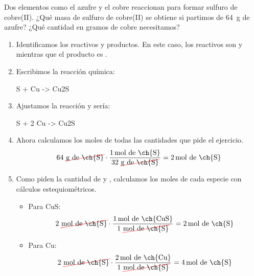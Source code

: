 \begin{example}

    Dos elementos como el azufre y el cobre reaccionan para formar sulfuro de cobre(II). ¿Qué masa de sulfuro de cobre(II) se obtiene si partimos de \qty{64}{\g} de azufre?
    ¿Qué cantidad en gramos de cobre necesitamos?

    \begin{enumerate}[label=\numberballmDarkTeal]
            \item Identificamos los reactivos y productos.
            En este caso, los reactivos son  y  mientras que el producto es .
            \item Escribimos la reacción química:
            \begin{reaction*}
                S + Cu -> Cu2S
            \end{reaction*}
            \item Ajustamos la reacción y sería:
            \begin{reaction*}
                S + 2 Cu -> Cu2S
            \end{reaction*}
            \item Ahora calculamos los moles de todas las cantidades que pide el ejercicio.
            \begin{equation*}
                64\ \cancelred{\unit{\g}\ \text{de \ch{S}}} \cdot \dfrac{\qty{1}{\mole}\ \text{de \ch{S}}}{32\ \cancelred{\unit{\g} \ \text{de \ch{S}}}} = \qty{2}{\mol}\ \text{de \ch{S}}
            \end{equation*}
            \item Como piden la cantidad de  y , calculamos los moles de cada especie con cálculos estequiométricos.
            \begin{itemize}
                \item Para CuS:
                \begin{equation*}
                    2\ \cancelred{\unit{\mol}\ \text{de \ch{S}}} \cdot \dfrac{\qty{1}{\mole}\ \text{de \ch{CuS}}}{1\ \cancelred{\unit{\mole} \ \text{de \ch{S}}}} = \qty{2}{\mol}\ \text{de \ch{S}}
                \end{equation*}
                \item Para Cu:
                \begin{equation*}
                    2\ \cancelred{\unit{\mol}\ \text{de \ch{S}}} \cdot \dfrac{\qty{2}{\mole}\ \text{de \ch{Cu}}}{1\ \cancelred{\unit{\mole} \ \text{de \ch{S}}}} = \qty{4}{\mol}\ \text{de \ch{S}}

\end{equation*}
\end{itemize}
\end{enumerate}
\end{example}
